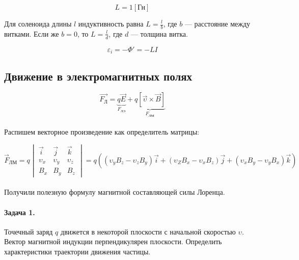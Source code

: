 \documentclass[dvipdfmx]{article}
\begin{document}
\begin{equation*}
  L = 1[\text{Гн}]
\end{equation*}

Для соленоида длины $l$ индуктивность равна $L = \frac{l}{b}$, где $b$ --- расстояние между витками. Если же $b = 0$,
то $L = \frac{l}{d}$, где $d$ --- толщина витка.

\begin{equation*}
  \varepsilon_i = -\Phi' = -LI
\end{equation*}

\newpage

\subsection{Движение в электромагнитных полях}

\begin{equation*}
  \vec{F_{\text{Л}}} = \underbrace{q\vec{E}}_{F_\text{ЛЭ}} + \underbrace{q\left[\vec{\upsilon}\times\vec{B}\right]}_{F_\text{ЛМ}}
\end{equation*}
\paragraph{}

Распишем векторное произведение как определитель матрицы:

\begin{equation*}
  \vec{F}_{\text{ЛМ}}
  =
  q
  \begin{vmatrix}
    \vec{i} & \vec{j} & \vec{k}\\
    \upsilon_x & \upsilon_y & \upsilon_z\\
    B_x & B_y & B_z
  \end{vmatrix}
  =
  q\left(
  (\upsilon_yB_z - \upsilon_zB_y)\vec{i}
  +
  (\upsilon_ZB_x - \upsilon_xB_z)\vec{j}
  +
  (\upsilon_xB_y - \upsilon_yB_x)\vec{k}
  \right)
\end{equation*}
\paragraph{}

Получили полезную формулу магнитной составляющей силы Лоренца.

\paragraph{Задача 1.}

Точечный заряд $q$ движется в некоторой плоскости с начальной скоростью $\upsilon$. Вектор магнитной
индукции перпендикулярен плоскости. Определить характеристики траектории движения частицы.
\end{document}
